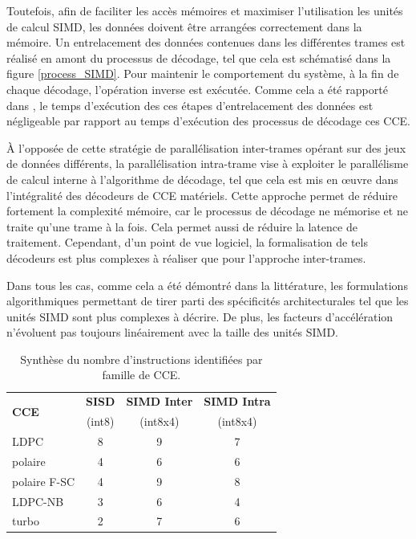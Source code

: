 \documentclass[../main.tex]{subfiles}
\begin{document}
Toutefois, afin de faciliter les accès mémoires et maximiser l'utilisation les unités de calcul SIMD, les données doivent être arrangées correctement dans la mémoire. 
Un entrelacement des données contenues dans les différentes trames est réalisé en amont du processus de décodage, tel que cela est schématisé dans la figure \ref{process_SIMD}. 
Pour maintenir le comportement du système, à la fin de chaque décodage, l'opération inverse est exécutée. 
Comme cela a été rapporté dans \cite{LDPC:SOFT4}, le temps d'exécution des ces étapes d'entrelacement des données est négligeable par rapport au temps d'exécution des processus de décodage ces CCE.

À l'opposée de cette stratégie de parallélisation inter-trames opérant sur des jeux de données différents, la parallélisation intra-trame vise à exploiter le parallélisme de calcul interne à l'algorithme de décodage, tel que cela est mis en œuvre dans l'intégralité des décodeurs de CCE matériels. 
Cette approche permet de réduire fortement la complexité mémoire, car le processus de décodage ne mémorise et ne traite qu'une trame à la fois. 
Cela permet aussi de réduire la latence de traitement. 
Cependant, d'un point de vue logiciel, la formalisation de tels décodeurs est plus complexes à réaliser que pour l'approche inter-trames.

Dans tous les cas, comme cela a été démontré dans la littérature, les formulations algorithmiques permettant de tirer parti des spécificités architecturales tel que les unités SIMD sont plus complexes à décrire. 
De plus, les facteurs d'accélération n'évoluent pas toujours linéairement avec la taille des unités SIMD.



\begin{table}
    \centering
    \footnotesize
    \begin{tabular}{lccc}
        \toprule
        \multirow{2}{*}{\textbf{CCE}}&  \textbf{SISD} & \textbf{SIMD Inter} & \textbf{SIMD Intra}     \\
                            & (int8)&(int8x4)   & (int8x4)      \\
        \toprule
        LDPC                & 8     & 9         & 7             \\
        \cmidrule(l){2-4}
        polaire             & 4     & 6         & 6             \\
        \cmidrule(l){2-4}
        polaire F-SC        & 4     & 9         & 8             \\
        \cmidrule(l){2-4}
        LDPC-NB             & 3     & 6         & 4             \\
        \cmidrule(l){2-4}
        turbo               & 2     &  7        & 6             \\
        \bottomrule
    \end{tabular}
    \caption{Synthèse du nombre d'instructions identifiées par famille de CCE.}
    \label{sum:all:instr}
\end{table}
\end{document}
